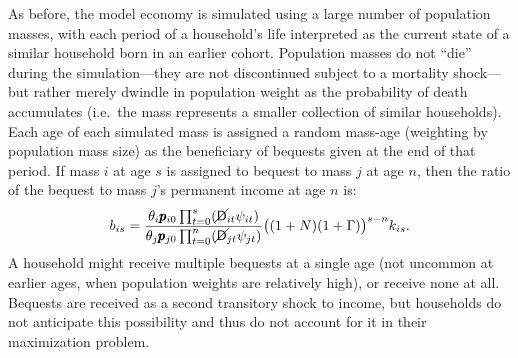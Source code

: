 \documentclass[11pt,a4paper,pdftex]{article}\usepackage[pdftex]{graphicx}\usepackage{epstopdf} \usepackage[pdftex]{hyperref}
\newcommand{\kRat}{\ensuremath{k}}
\newcommand{\PDies}{\ensuremath{\mathsf{D}}}
\newcommand{\pLev}{\ensuremath{\pmb{p}}}
\newcommand{\PLives}{\ensuremath{\cancel{\PDies}}}
\newcommand{\pshk}{\psi} %
\begin{document}
As before, the model economy is simulated using a large number of population masses, with each period of a household's life interpreted as the current state of a similar household born in an earlier cohort.  Population masses do not ``die'' during the simulation---they are not discontinued subject to a mortality shock---but rather merely dwindle in population weight as the probability of death accumulates (i.e.\ the mass represents a smaller collection of similar households).  Each age of each simulated mass is assigned a random mass-age (weighting by population mass size) as the beneficiary of bequests given at the end of that period.  If mass $i$ at age $s$ is assigned to bequest to mass $j$ at age $n$, then the ratio of the bequest to mass $j$'s permanent income at age $n$ is:
\begin{equation}\label{eq:Bequest}
b_{is} = \frac{\theta_i \pLev_{i0} \prod_{t = 0}^s (\PLives_{it} \pshk_{it})}{\theta_j \pLev_{j0} \prod_{t = 0}^n (\PLives_{jt} \pshk_{jt})}\big((1 + N)(1 + \Gamma)\big)^{s - n} \kRat_{is}.
\end{equation}
A household might receive multiple bequests at a single age (not uncommon at earlier ages, when population weights are relatively high), or receive none at all.  Bequests are received as a second transitory shock to income, but households do not anticipate this possibility and thus do not account for it in their maximization problem.
\end{document}
